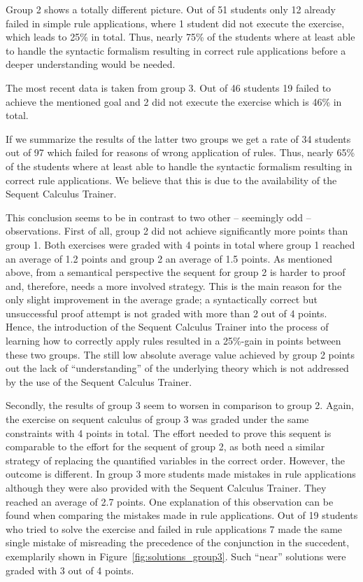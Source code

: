 \documentclass[a4paper,UKenglish]{lipics}
\begin{document}
Group 2 shows a totally different picture. 
Out of 51 students only 12 already failed in simple rule applications, where 1 student did not execute the exercise, which leads to 25\% in total. Thus,
nearly 75\% of the students where at least able to handle the syntactic formalism resulting in correct rule applications before a deeper 
understanding would be needed. 

The most recent data is taken from group 3. Out of 46 students 19 failed to achieve the mentioned goal and 2 did not execute the exercise which is 46\%
in total.

If we summarize the results of the latter two groups we get a rate of 34 students out of 97 which failed for reasons of wrong application of rules. Thus,
nearly 65\% of the students where at least able to handle the syntactic formalism resulting in correct rule applications. We believe that this is due to 
the availability of the Sequent Calculus Trainer.

This conclusion seems to be in contrast to two other -- seemingly odd -- observations. First of all, group 2 did not achieve significantly more points than group 1.
Both exercises were graded with 4 points in total where group 1 reached an average of 1.2 points and group 2 an average of 1.5 points. As mentioned 
above, from a semantical perspective the sequent for group 2 is harder to proof and, therefore, needs a more involved strategy. This is the main reason 
for the only slight improvement in the average grade; a syntactically correct but unsuccessful proof attempt is not graded with more than 2 out of 4
points. Hence, the introduction of the Sequent Calculus Trainer into the process of learning how to correctly apply rules resulted in a 25\%-gain in
points between these two groups. The still low absolute average value achieved by group 2 points out the lack of ``understanding'' of the underlying theory which is not addressed by the use of the Sequent Calculus Trainer. 

Secondly, the results of group 3 seem to worsen in comparison to group 2. Again, the exercise on sequent calculus of group 3 was graded under the same
constraints with 4 points in total. The effort needed to prove this sequent is comparable to the effort for the sequent of group 2, as both need a
similar strategy of replacing the quantified variables in the correct order. However, the outcome is different. In group 3 more students made mistakes in
rule applications although they were also provided with the Sequent Calculus Trainer. They reached an average of 2.7 points. One explanation of
this observation can be found when comparing the mistakes made in rule applications. Out of 19 students who tried to solve the exercise and failed in
rule applications 7 made the same single mistake of misreading the precedence of the conjunction in the succedent, exemplarily shown in
Figure~\ref{fig:solutions_group3}. Such ``near'' solutions were graded with 3 out of 4 points.
\end{document}
